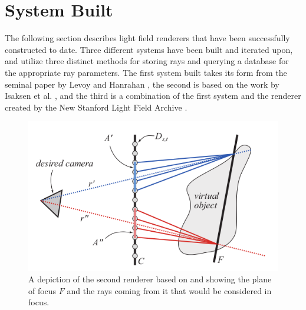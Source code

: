 \documentclass[12pt]{report}
\begin{document}
\section{System Built}
The following section describes light field renderers that have been successfully constructed to date. Three different systems have been built and iterated upon, and utilize three distinct methods for storing rays and querying a database for the appropriate ray parameters. The first system built takes its form from the seminal paper by Levoy and Hanrahan \cite{Levoy96}, the second is based on the work by Isaksen et al. \cite{Isaksen01}, and the third is a combination of the first system and the renderer created by the New Stanford Light Field Archive \cite{lfArchive}.
\begin{figure}[!ht]
	\centering
	\includegraphics[scale=0.7]{mobile_focus.png}
	\caption{A depiction of the second renderer based on \cite{Isaksen01} and showing the plane of focus $F$ and the rays coming from it that would be considered in focus.}
	\label{fig:mobile_focus}
\end{figure}
\end{document}
